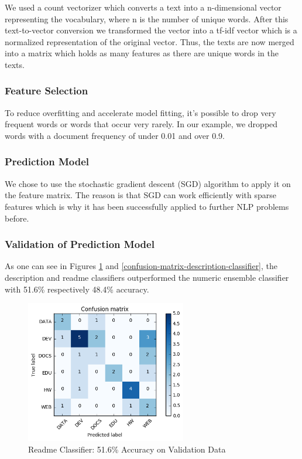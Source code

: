 \documentclass[%
a4paper,
DIV12,
2.5headlines,
bigheadings,
titlepage,
openbib,
]{scrartcl}
\begin{document}
We used a count vectorizer which converts a text into a n-dimensional vector representing the vocabulary, where n is the number of unique words.
After this text-to-vector conversion we transformed the vector into a tf-idf vector which is a normalized representation of the original vector.
Thus, the texts are now merged into a matrix which holds as many features as there are unique words in the texts.

\subsubsection{Feature Selection}\label{feature-selection-1}

To reduce overfitting and accelerate model fitting, it's possible to drop very frequent words or words that occur very rarely.
In our example, we dropped words with a document frequency of under 0.01 and over 0.9.

\subsubsection{Prediction Model}\label{prediction-model-1}

We chose to use the stochastic gradient descent (SGD) algorithm to apply it on the feature matrix.
The reason is that SGD can work efficiently with sparse features which is why it has been successfully applied to further NLP problems before.



\subsubsection{Validation of Prediction Model}\label{validation-of-prediction-model-1}

As one can see in Figures \ref{confusion-matrix-readme-classifier} and \ref{confusion-matrix-description-classifier}, the description and readme classifiers outperformed the numeric ensemble classifier with 51.6\% respectively 48.4\% accuracy.
\begin{figure}[H]
	\centering
		\includegraphics[width=7cm]{graphics/confusion-matrix-readme-classifier.png}
	\caption{Readme Classifier: 51.6\% Accuracy on Validation Data}
	\label{confusion-matrix-readme-classifier}
\end{figure}
\end{document}
